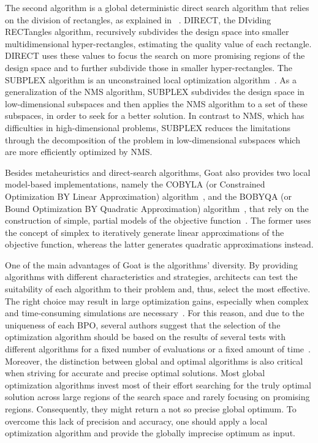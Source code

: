 The second algorithm is a global deterministic direct search algorithm that relies on the division of rectangles, as explained in ~\cite{Jones1993DIRECT}. DIRECT, the DIviding RECTangles algorithm, recursively subdivides the design space into smaller multidimensional hyper-rectangles, estimating the quality value of each rectangle. DIRECT uses these values to focus the search on more promising regions of the design space and to further subdivide those in smaller hyper-rectangles. 
The SUBPLEX algorithm is an unconstrained local optimization algorithm~\cite{Rowan1990}. As a generalization of the \ac{NMS} algorithm, SUBPLEX subdivides the design space in low-dimensional subspaces and then applies the \ac{NMS} algorithm to a set of these subspaces, in order to seek for a better solution. In contrast to \ac{NMS}, which has difficulties in high-dimensional problems, SUBPLEX reduces the limitations through the decomposition of the problem in low-dimensional subspaces which are more efficiently optimized by \ac{NMS}.

Besides metaheuristics and direct-search algorithms, Goat also provides two local model-based implementations, namely the COBYLA (or Constrained Optimization BY Linear Approximation) algorithm~\cite{Powell1994COBYLA}, and the BOBYQA (or Bound Optimization BY Quadratic Approximation) algorithm~\cite{Powell2009BOBYQA}, that rely on the construction of simple, partial models of the objective function~\cite{Koziel2011}. The former uses the concept of simplex to iteratively generate linear approximations of the objective function, whereas the latter generates quadratic approximations instead. 

One of the main advantages of Goat is the algorithms' diversity. By providing algorithms with different characteristics and strategies, architects can test the suitability of each algorithm to their problem and, thus, select the most effective. The right choice may result in large optimization gains, especially when complex and time-consuming simulations are necessary~\cite{Wortmann2016BBO}. For this reason, and due to the uniqueness of each \ac{BPO}, several authors suggest that the selection of the optimization algorithm should be based on the results of several tests with different algorithms for a fixed number of evaluations or a fixed amount of time~\cite{Hamdy2016,Wortmann2016BBO}. Moreover, the distinction between global and optimal algorithms is also critical when striving for accurate and precise optimal solutions. Most global optimization algorithms invest most of their effort searching for the truly optimal solution across large regions of the search space and rarely focusing on promising regions. Consequently, they might return a not so precise global optimum. To overcome this lack of precision and accuracy, one should apply a local optimization algorithm and provide the globally imprecise optimum as input.

